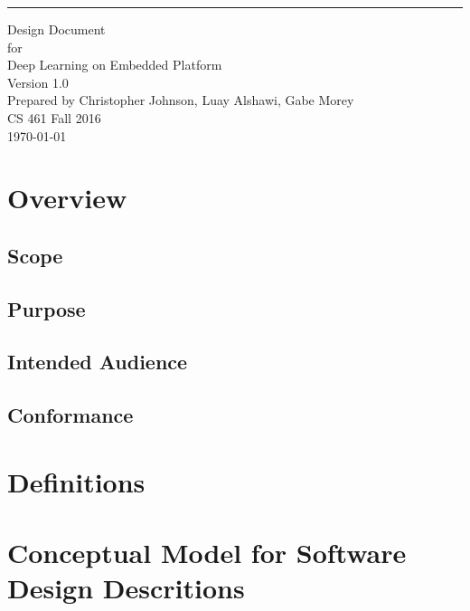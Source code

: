 \documentclass{scrreprt}
\date{}
\newcommand\blankpage{%
    \null
    \thispagestyle{empty}%
    \addtocounter{page}{-1}%
    \newpage}
\def\myversion{1.0 }
\begin{document}
\begin{flushright}
    \rule{16cm}{5pt}\vskip1cm
    \begin{bfseries}
        \Huge{Design Document}\\
        \vspace{1.9cm}
        for\\
        \vspace{1.9cm}
        Deep Learning on Embedded Platform\\
        \vspace{1.9cm}
        \LARGE{Version \myversion}\\
        \vspace{1.9cm}
        Prepared by Christopher Johnson, Luay Alshawi, Gabe Morey\\
        \vspace{1.9cm}
        CS 461 Fall 2016\\
        \vspace{1.9cm}
        \today\\
    \end{bfseries}
\end{flushright}
\afterpage{\blankpage}

\tableofcontents

\chapter{Overview}
\section{Scope}

\section{Purpose}

\section{Intended Audience}

\section{Conformance}

\chapter{Definitions}

\chapter{Conceptual Model for Software Design Descritions}
\end{document}
